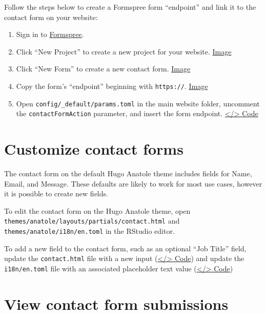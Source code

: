 \documentclass[
]{book}
\begin{document}
Follow the steps below to create a Formspree form ``endpoint'' and link it to the contact form on your website:

\begin{enumerate}
\def\labelenumi{\arabic{enumi}.}
\item
  Sign in to \href{https://formspree.io/login}{Formspree}.
\item
  Click ``New Project'' to create a new project for your website. \href{https://i.imgur.com/jZnrcVL.png}{Image}
\item
  Click ``New Form'' to create a new contact form. \href{https://i.imgur.com/BE4tOJ4.png}{Image}
\item
  Copy the form's ``endpoint'' beginning with \texttt{https://}. \href{https://i.imgur.com/2S2HVO6.png}{Image}
\item
  Open \texttt{config/\_default/params.toml} in the main website folder, uncomment the \texttt{contactFormAction} parameter, and insert the form endpoint. \href{https://github.com/dannymorris/r4sites-anatole-custom/blob/master/config/_default/params.toml\#L16-L17}{\textless/\textgreater{} Code}
\end{enumerate}

\hypertarget{customize-contact-forms}{%
\section{Customize contact forms}\label{customize-contact-forms}}

The contact form on the default Hugo Anatole theme includes fields for Name, Email, and Message. These defaults are likely to work for most use cases, however it is possible to create new fields.

To edit the contact form on the Hugo Anatole theme, open \texttt{themes/anatole/layouts/partials/contact.html} and \texttt{themes/anatole/i18n/en.toml} in the RStudio editor.

To add a new field to the contact form, such as an optional ``Job Title'' field, update the \texttt{contact.html} file with a new input (\href{https://github.com/dannymorris/r4sites-anatole-custom/blob/master/themes/anatole/layouts/partials/contact.html\#L13-L16}{\textless/\textgreater{} Code}) and update the \texttt{i18n/en.toml} file with an associated placeholder text value (\href{https://github.com/dannymorris/r4sites-anatole-custom/blob/master/themes/anatole/i18n/en.toml\#L35-L36}{\textless/\textgreater{} Code})

\hypertarget{view-contact-form-submissions}{%
\section{View contact form submissions}\label{view-contact-form-submissions}}
\end{document}
